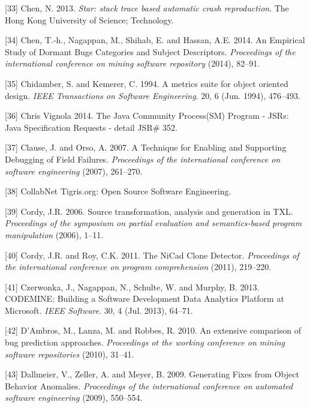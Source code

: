 \documentclass[12pt]{report}
\begin{document}
\hypertarget{ref-Chen2013}{}
{[}33{]} Chen, N. 2013. \emph{Star: stack trace based automatic crash
reproduction}. The Hong Kong University of Science; Technology.

\hypertarget{ref-Chen2014}{}
{[}34{]} Chen, T.-h., Nagappan, M., Shihab, E. and Hassan, A.E. 2014. An
Empirical Study of Dormant Bugs Categories and Subject Descriptors.
\emph{Proceedings of the international conference on mining software
repository} (2014), 82--91.

\hypertarget{ref-Chidamber1994}{}
{[}35{]} Chidamber, S. and Kemerer, C. 1994. A metrics suite for object
oriented design. \emph{IEEE Transactions on Software Engineering}. 20, 6
(Jun. 1994), 476--493.

\hypertarget{ref-ChrisVignola2014}{}
{[}36{]} Chris Vignola 2014. The Java Community Process(SM) Program -
JSRs: Java Specification Requests - detail JSR\# 352.

\hypertarget{ref-Clause2007}{}
{[}37{]} Clause, J. and Orso, A. 2007. A Technique for Enabling and
Supporting Debugging of Field Failures. \emph{Proceedings of the
international conference on software engineering} (2007), 261--270.

\hypertarget{ref-CollabNet}{}
{[}38{]} CollabNet Tigris.org: Open Source Software Engineering.

\hypertarget{ref-Cordy2006a}{}
{[}39{]} Cordy, J.R. 2006. Source transformation, analysis and
generation in TXL. \emph{Proceedings of the symposium on partial
evaluation and semantics-based program manipulation} (2006), 1--11.

\hypertarget{ref-Cordy2011}{}
{[}40{]} Cordy, J.R. and Roy, C.K. 2011. The NiCad Clone Detector.
\emph{Proceedings of the international conference on program
comprehension} (2011), 219--220.

\hypertarget{ref-Czerwonka2013}{}
{[}41{]} Czerwonka, J., Nagappan, N., Schulte, W. and Murphy, B. 2013.
CODEMINE: Building a Software Development Data Analytics Platform at
Microsoft. \emph{IEEE Software}. 30, 4 (Jul. 2013), 64--71.

\hypertarget{ref-DAmbros2010}{}
{[}42{]} D'Ambros, M., Lanza, M. and Robbes, R. 2010. An extensive
comparison of bug prediction approaches. \emph{Proceedings ot the
working conference on mining software repositories} (2010), 31--41.

\hypertarget{ref-Dallmeier}{}
{[}43{]} Dallmeier, V., Zeller, A. and Meyer, B. 2009. Generating Fixes
from Object Behavior Anomalies. \emph{Proceedings of the international
conference on automated software engineering} (2009), 550--554.
\end{document}
